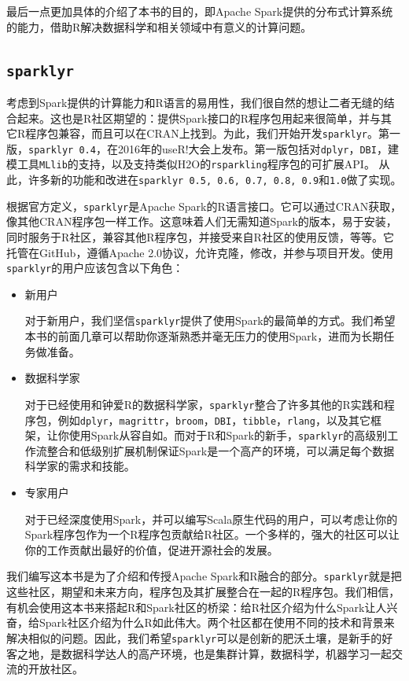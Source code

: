 \documentclass[
]{article}
\begin{document}
最后一点更加具体的介绍了本书的目的，即Apache
Spark提供的分布式计算系统的能力，借助R解决数据科学和相关领域中有意义的计算问题。

\hypertarget{sparklyr}{%
\subsection{\texorpdfstring{\texttt{sparklyr}}{sparklyr}}\label{sparklyr}}

考虑到Spark提供的计算能力和R语言的易用性，我们很自然的想让二者无缝的结合起来。这也是R社区期望的：提供Spark接口的R程序包用起来很简单，并与其它R程序包兼容，而且可以在CRAN上找到。为此，我们开始开发\texttt{sparklyr}。第一版，\texttt{sparklyr\ 0.4}，在2016年的useR!大会上发布。第一版包括对\texttt{dplyr}，\texttt{DBI}，建模工具\texttt{MLlib}的支持，以及支持类似H2O的\texttt{rsparkling}程序包的可扩展API。
从此，许多新的功能和改进在\texttt{sparklyr\ 0.5,\ 0.6,\ 0.7,\ 0.8,\ 0.9}和\texttt{1.0}做了实现。

根据官方定义，\texttt{sparklyr}是Apache
Spark的R语言接口。它可以通过CRAN获取，像其他CRAN程序包一样工作。这意味着人们无需知道Spark的版本，易于安装，同时服务于R社区，兼容其他R程序包，并接受来自R社区的使用反馈，等等。它托管在GitHub，遵循Apache
2.0协议，允许克隆，修改，并参与项目开发。使用\texttt{sparklyr}的用户应该包含以下角色：

\begin{itemize}
\item
  新用户

  对于新用户，我们坚信\texttt{sparklyr}提供了使用Spark的最简单的方式。我们希望本书的前面几章可以帮助你逐渐熟悉并毫无压力的使用Spark，进而为长期任务做准备。
\item
  数据科学家

  对于已经使用和钟爱R的数据科学家，\texttt{sparklyr}整合了许多其他的R实践和程序包，例如\texttt{dplyr}，\texttt{magrittr}，\texttt{broom}，\texttt{DBI}，\texttt{tibble}，\texttt{rlang}，以及其它框架，让你使用Spark从容自如。而对于R和Spark的新手，\texttt{sparklyr}的高级别工作流整合和低级别扩展机制保证Spark是一个高产的环境，可以满足每个数据科学家的需求和技能。
\item
  专家用户

  对于已经深度使用Spark，并可以编写Scala原生代码的用户，可以考虑让你的Spark程序包作为一个R程序包贡献给R社区。一个多样的，强大的社区可以让你的工作贡献出最好的价值，促进开源社会的发展。
\end{itemize}

我们编写这本书是为了介绍和传授Apache
Spark和R融合的部分。\texttt{sparklyr}就是把这些社区，期望和未来方向，程序包及其扩展整合在一起的R程序包。我们相信，有机会使用这本书来搭起R和Spark社区的桥梁：给R社区介绍为什么Spark让人兴奋，给Spark社区介绍为什么R如此伟大。两个社区都在使用不同的技术和背景来解决相似的问题。因此，我们希望\texttt{sparklyr}可以是创新的肥沃土壤，是新手的好客之地，是数据科学达人的高产环境，也是集群计算，数据科学，机器学习一起交流的开放社区。
\end{document}
